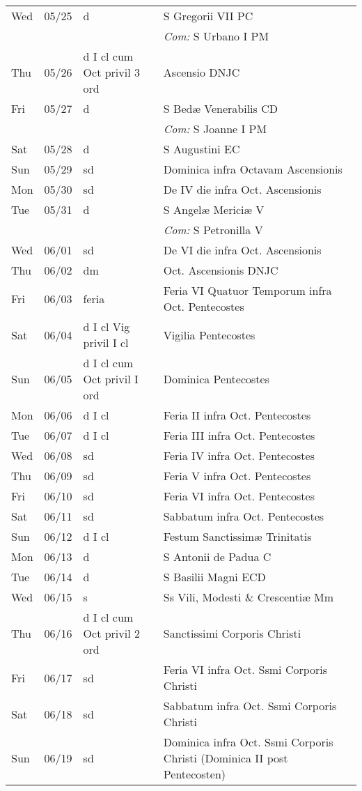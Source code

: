 \documentclass[10pt]{article}
\begin{document}
\begin{longtable}{ l l l l }
Wed & 05/25 & d & S Gregorii VII PC\\
 & & & \textit{Com:} S Urbano I PM\\
Thu & 05/26 & d I cl cum Oct privil 3 ord & Ascensio DNJC\\
Fri & 05/27 & d & S Bedæ Venerabilis CD\\
 & & & \textit{Com:} S Joanne I PM\\
Sat & 05/28 & d & S Augustini EC\\
Sun & 05/29 & sd & Dominica infra Octavam Ascensionis\\
Mon & 05/30 & sd & De IV die infra Oct. Ascensionis\\
Tue & 05/31 & d & S Angelæ Mericiæ V\\
 & & & \textit{Com:} S Petronilla V\\
Wed & 06/01 & sd & De VI die infra Oct. Ascensionis\\
Thu & 06/02 & dm & Oct. Ascensionis DNJC\\
Fri & 06/03 & feria & Feria VI Quatuor Temporum infra Oct. Pentecostes\\
Sat & 06/04 & d I cl Vig privil I cl & Vigilia Pentecostes\\
Sun & 06/05 & d I cl cum Oct privil I ord & Dominica Pentecostes\\
Mon & 06/06 & d I cl & Feria II infra Oct. Pentecostes\\
Tue & 06/07 & d I cl & Feria III infra Oct. Pentecostes\\
Wed & 06/08 & sd & Feria IV infra Oct. Pentecostes\\
Thu & 06/09 & sd & Feria V infra Oct. Pentecostes\\
Fri & 06/10 & sd & Feria VI infra Oct. Pentecostes\\
Sat & 06/11 & sd & Sabbatum infra Oct. Pentecostes\\
Sun & 06/12 & d I cl & Festum Sanctissimæ Trinitatis\\
Mon & 06/13 & d & S Antonii de Padua C\\
Tue & 06/14 & d & S Basilii Magni ECD\\
Wed & 06/15 & s & Ss Vili, Modesti \& Crescentiæ Mm\\
Thu & 06/16 & d I cl cum Oct privil 2 ord & Sanctissimi Corporis Christi\\
Fri & 06/17 & sd & Feria VI infra Oct. Ssmi Corporis Christi\\
Sat & 06/18 & sd & Sabbatum infra Oct. Ssmi Corporis Christi\\
Sun & 06/19 & sd & Dominica infra Oct. Ssmi Corporis Christi (Dominica II post Pentecosten)\\

\end{longtable}
\end{document}
